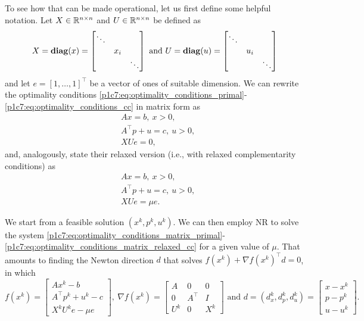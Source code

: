 To see how that can be made operational, let us first define some helpful notation. Let $X\in \mathbb{R}^{n\times n}$ and $U \in \mathbb{R}^{n \times n}$ be defined as
	$$
	X = \mathop{\bf diag}(x) = \begin{bmatrix} \ddots & & \\   
	                                        & x_i & \\
	                                        & & \ddots     
	                 \end{bmatrix}
	                 \text{ and }
	U = \mathop{\bf diag}(u) = \begin{bmatrix} \ddots & & \\   
	                                        & u_i & \\
	                                        & & \ddots     
	                 \end{bmatrix}               
	$$
	and let $e = [1,\dots,1]^\top$ be a vector of ones of suitable dimension. We can rewrite the optimality conditions \eqref{p1c7:eq:optimality_conditions_primal}- \eqref{p1c7:eq:optimality_conditions_cc} in matrix form as 
	\begin{align*}
		&Ax = b, \ x > 0, \\ 
		&A^\top p + u = c, \ u > 0,\\ 
		&XUe = 0, 
	\end{align*}
 	and, analogously, state their relaxed version (i.e., with relaxed complementarity conditions) as
 	\begin{align}
		&Ax = b, \ x > 0, \label{p1c7:eq:optimality_conditions_matrix_primal}\\ 
		&A^\top p + u = c, \ u > 0, \label{p1c7:eq:optimality_conditions_matrix_dual}\\ 
		&XUe = \mu e. \label{p1c7:eq:optimality_conditions_matrix_relaxed_cc}
	\end{align}

We start from a feasible solution $(x^{k}, p^{k}, u^{k})$. We can then employ NR to solve the system \eqref{p1c7:eq:optimality_conditions_matrix_primal}-\eqref{p1c7:eq:optimality_conditions_matrix_relaxed_cc} for a given value of $\mu$. That amounts to finding the Newton direction $d$ that solves $f(x^k) + \nabla f(x^k)^\top d = 0$, in which
	\begin{equation*}
	f(x^k) = \begin{bmatrix}
				Ax^k - b \\
				A^\top p^k + u^k - c \\
				X^k U^k e - \mu e 
			   \end{bmatrix},	   
		\ \nabla f(x^k) = \begin{bmatrix}
					   A & 0 & 0 \\
					   0 & A^\top & I \\
					   U^k & 0 & X^k	
					  \end{bmatrix}
		 \text{ and } d = (d_x^k, d_p^k, d_u^k) = 
			\begin{bmatrix}
			x - x^k \\ 
			p - p^k \\
			u - u^k
		\end{bmatrix}.
	\end{equation*}	
	
